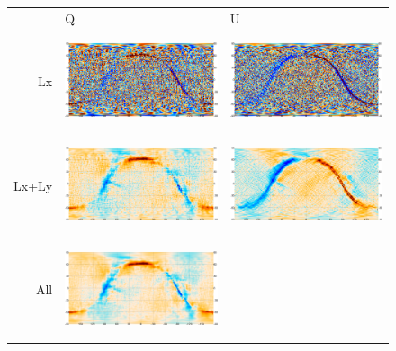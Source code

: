 \documentclass{article}
\begin{document}
\begin{figure}
	\centering
	\hspace*{-5mm}\begin{tabular}{rm{54.4mm}m{56mm}}
		&
		\hspace{32mm}Q &
		\hspace{32mm}U \\
		Lx &
		\includegraphics[height=28mm,clip,trim=7.5mm 8mm 7.5mm 0]{plots/ellip_mismatch_sky_sb_det0_map_1.png} &
		\includegraphics[height=28mm,clip,trim=7.5mm 8mm 0 0]{plots/ellip_mismatch_sky_sb_det0_map_2.png} \\
		Lx+Ly &
		\includegraphics[height=28mm,clip,trim=7.5mm 8mm 7.5mm 0]{plots/ellip_mismatch_sky_sb_det01_map_1.png} &
		\includegraphics[height=28mm,clip,trim=7.5mm 8mm 0 0]{plots/ellip_mismatch_sky_sb_det01_map_2.png} \\
		All &
		\includegraphics[height=28mm,clip,trim=7.5mm 8mm 7.5mm 0]{plots/ellip_mismatch_sky_sb_tot_map_1.png} &

\end{tabular}
\end{figure}
\end{document}
